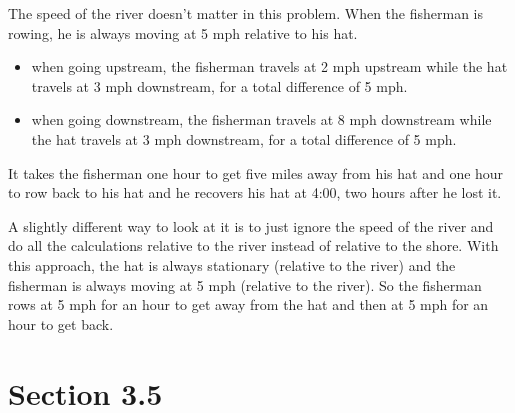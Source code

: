 \documentclass[letterpaper, landscape]{exam}
\begin{document}
  \begin{solution}
    The speed of the river doesn't matter in this problem.  When the
    fisherman is rowing, he is always moving at 5 mph relative to his hat.

    \begin{itemize} 
      \item when going upstream, the fisherman travels at 2 mph upstream while
        the hat travels at 3 mph downstream, for a total difference of 5 mph.  

      \item when going downstream, the fisherman travels at 8 mph downstream
        while the hat travels at 3 mph downstream, for a total difference of 5
        mph.  
    \end{itemize}

    It takes the fisherman one hour to get five miles away from his hat and
    one hour to row back to his hat and he recovers his hat at 4:00, two hours
    after he lost it.

    A slightly different way to look at it is to just ignore the speed of the
    river and do all the calculations relative to the river instead of relative
    to the shore.  With this approach, the hat is always stationary (relative to
    the river) and the fisherman is always moving at 5 mph (relative to the
    river).  So the fisherman rows at 5 mph for an hour to get away from the hat
    and then at 5 mph for an hour to get back.

  \end{solution}

  \ifprintanswers{}
    \section{Section 3.5} %
    
\end{document}
